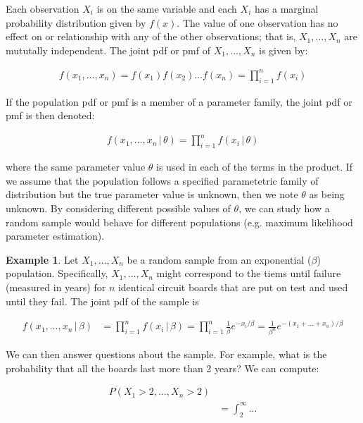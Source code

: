 \documentclass[11pt,a4paper]{report}
\theoremstyle{definition}
\theoremstyle{theorem}
\theoremstyle{example}
\newtheorem{ex}{Example}[section]
\begin{document}
Each observation $X_i$ is on the same variable and each $X_i$ has a marginal probability distribution given by $f(x)$.  The value of one observation has no effect on or relationship with any of the other observations; that is, $X_1, \dots, X_n$ are mututally independent.  The joint pdf or pmf of $X_1, \dots, X_n$ is given by:

\begin{align*}
  f(x_1, \dots, x_n) = f(x_1)f(x_2) \dots f(x_n) = \prod_{i=1}^n f(x_i)
\end{align*}

If the population pdf or pmf is a member of a parameter family, the joint pdf or pmf is then denoted:

\begin{align*}
  f(x_1, \dots, x_n \, | \, \theta) = \prod_{i=1}^n f(x_i \, | \, \theta)
\end{align*}

where the same parameter value $\theta$ is used in each of the terms in the product.  If we assume that the population follows a specified parametetric family of distribution but the true parameter value is unknown, then we note $\theta$ as being unknown.  By considering different possible values of $\theta$, we can study how a random sample would behave for different populations (e.g. maximum likelihood parameter estimation).

\begin{ex}
  Let $X_1, \dots, X_n$ be a random sample from an exponential ($\beta$) population.  Specifically, $X_1, \dots, X_n$ might correspond to the tiems until failure (measured in years) for $n$ identical circuit boards that are put on test and used until they fail.  The joint pdf of the sample is

  \begin{align*}
    f(x_1, \dots, x_n \, | \, \beta) &= \prod_{i=1}^n f(x_i \, | \, \beta) = \prod_{i=1}^n \frac{1}{\beta} e^{-x_i / \beta} = \frac{1}{\beta^n}e^{-(x_1 + \dots + x_n)/\beta}
  \end{align*}

  We can then answer questions about the sample.  For example, what is the probability that all the boards last more than 2 years?  We can compute:

  \begin{align*}
    P(X_1 > 2, \dots, X_n > 2) &\\
    &= \int_2^{\infty} \dots 
  \end{align*}
\end{ex}
\end{document}
